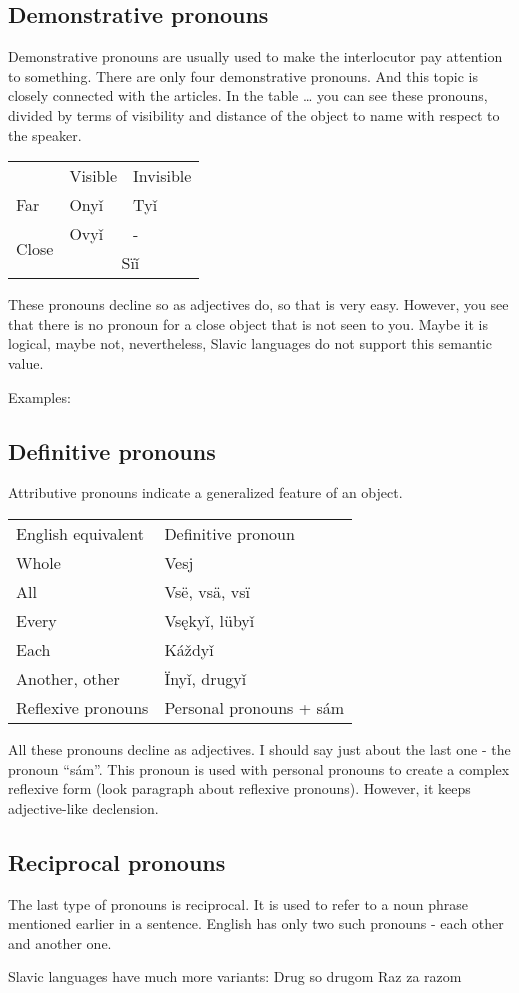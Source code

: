 \subsection{Demonstrative pronouns}

Demonstrative pronouns are usually used to make the interlocutor pay attention to something.
There are only four demonstrative pronouns. And this topic is closely connected with the articles. In the table … you can see these pronouns, divided by terms of visibility and distance of the object to name with respect to the speaker.


\begin{table}
	\begin{tabular}{lll}
		& Visible & Invisible \\
		Far & Onyǐ & Tyǐ \\
		\multirow{2}{*}{Close} & Ovyǐ & - \\ & \multicolumn{2}{c}{Sïǐ}  
	\end{tabular}
\end{table}

These pronouns decline so as adjectives do, so that is very easy. However, you see that there is no pronoun for a close object that is not seen to you. Maybe it is logical, maybe not, nevertheless, Slavic languages do not support this semantic value.

Examples:

\subsection{Definitive pronouns}

Attributive pronouns indicate a generalized feature of an object. 

\begin{table}
	\begin{tabular}{ll}
		English equivalent & Definitive pronoun \\
		Whole & Vesj \\
		All & Vsë, vsä, vsï \\
		Every & Vsękyǐ, lübyǐ \\
		Each & Káždyǐ \\
		Another, other & Ïnyǐ, drugyǐ \\
		Reflexive pronouns & Personal pronouns + sám
	\end{tabular}
\end{table}

All these pronouns decline as adjectives. I should say just about the last one - the pronoun “sám”. This pronoun is used with personal pronouns to create a complex reflexive form (look paragraph about reflexive pronouns). However, it keeps adjective-like declension.

\subsection{Reciprocal pronouns}


The last type of pronouns is reciprocal. It is used to refer to a noun phrase mentioned earlier in a sentence. English has only two such pronouns - each other and another one.

Slavic languages have much more variants:
Drug so drugom
Raz za razom

